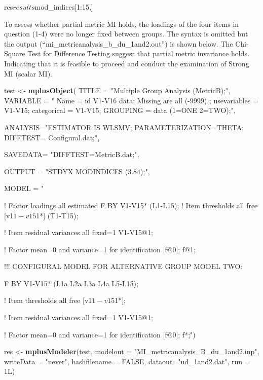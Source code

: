 \documentclass[]{book}
\newenvironment{Shaded}{\begin{snugshade}}{\end{snugshade}}
\newcommand{\DataTypeTok}[1]{\textcolor[rgb]{0.13,0.29,0.53}{#1}}
\newcommand{\KeywordTok}[1]{\textcolor[rgb]{0.13,0.29,0.53}{\textbf{#1}}}
\newcommand{\NormalTok}[1]{#1}
\newcommand{\OtherTok}[1]{\textcolor[rgb]{0.56,0.35,0.01}{#1}}
\newcommand{\StringTok}[1]{\textcolor[rgb]{0.31,0.60,0.02}{#1}}
\begin{document}
res\(results\)mod\_indices{[}1:15,{]}

To assess whether partial metric MI holds, the loadings of the four items in question (1-4) were no longer fixed between groups. The syntax is omitted but the output (``mi\_metricanalysis\_b\_du\_1and2.out'') is shown below. The Chi-Square Test for Difference Testing suggest that partial metric invariance holds. Indicating that it is feasible to proceed and conduct the examination of Strong MI (scalar MI).

\begin{Shaded}
\begin{Highlighting}[]
\NormalTok{test <-}\StringTok{ }\KeywordTok{mplusObject}\NormalTok{(}
\DataTypeTok{TITLE =} \StringTok{"Multiple Group Analysis (MetricB);"}\NormalTok{,}
\DataTypeTok{VARIABLE =} \StringTok{"}
\StringTok{Name = id V1-V16 data;}
\StringTok{Missing are all (-9999) ;}
\StringTok{usevariables = V1-V15;}
\StringTok{categorical = V1-V15;}
\StringTok{GROUPING = data (1=ONE 2=TWO);"}\NormalTok{,}

\DataTypeTok{ANALYSIS=}\StringTok{"ESTIMATOR IS WLSMV; }
\StringTok{PARAMETERIZATION=THETA;}
\StringTok{DIFFTEST= Configural.dat;"}\NormalTok{,}

\DataTypeTok{SAVEDATA=} \StringTok{"DIFFTEST=MetricB.dat;"}\NormalTok{,}

\DataTypeTok{OUTPUT =} \StringTok{"STDYX MODINDICES (3.84);"}\NormalTok{,}

\DataTypeTok{MODEL =} \StringTok{" }

\StringTok{! Factor loadings all estimated         }
\StringTok{ F BY V1-V15* (L1-L15);}
\StringTok{       }
\StringTok{! Item thresholds all free     }
\StringTok{[v1$1-v15$1*] (T1-T15);    }

\StringTok{! Item residual variances all fixed=1     }
\StringTok{V1-V15@1; }

\StringTok{! Factor mean=0 and variance=1 for identification }
\StringTok{[f@0]; f@1; }

\StringTok{!!! CONFIGURAL MODEL FOR ALTERNATIVE GROUP      }
\StringTok{MODEL TWO:        }

\StringTok{ F BY V1-V15* (L1a L2a L3a L4a L5-L15);}

\StringTok{! Item thresholds all free     }
\StringTok{[v1$1-v15$1*]; }

\StringTok{! Item residual variances all fixed=1     }
\StringTok{V1-V15@1; }

\StringTok{! Factor mean=0 and variance=1 for identification }
\StringTok{[f@0]; f*;"}\NormalTok{)}

\NormalTok{res <-}\StringTok{ }\KeywordTok{mplusModeler}\NormalTok{(test, }\DataTypeTok{modelout =} \StringTok{"MI_metricanalysis_B_du_1and2.inp"}\NormalTok{, }
                    \DataTypeTok{writeData =} \StringTok{"never"}\NormalTok{, }
                    \DataTypeTok{hashfilename =} \OtherTok{FALSE}\NormalTok{, }
                    \DataTypeTok{dataout=}\StringTok{"ud_1and2.dat"}\NormalTok{, }\DataTypeTok{run =}\NormalTok{ 1L)}
\end{Highlighting}
\end{Shaded}
\end{document}
